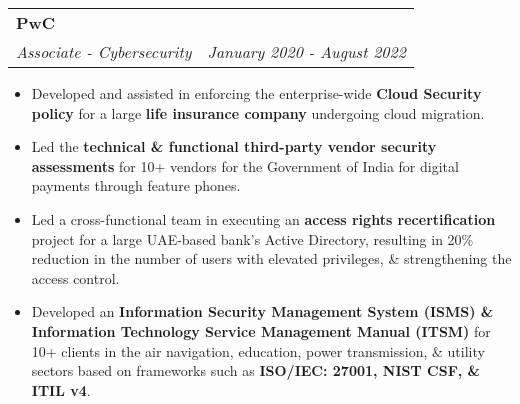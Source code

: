 \documentclass[letterpaper,11pt]{article}
\makeatletter
\newcommand{\resumeItem}[1]{
  \item\small{
    {#1 \vspace{-2pt}}
  }
}
\newcommand{\resumeSubheading}[4]{
  \vspace{-2pt}\item
    \begin{tabular*}{0.97\textwidth}[t]{l@{\extracolsep{\fill}}r}
      \textbf{#1} & #2 \\
      \textit{\small#3} & \textit{\small #4} \\
    \end{tabular*}\vspace{0pt}
}
\newcommand{\resumeItemListStart}{\begin{itemize}}
\newcommand{\resumeItemListEnd}{\end{itemize}\vspace{-5pt}}
\makeatother
\begin{document}
\resumeSubheading
      {PwC}{}
      {Associate - Cybersecurity}{January 2020 - August 2022}
      \resumeItemListStart
       \resumeItem{}
       {Developed and assisted in enforcing the enterprise-wide\textbf{ Cloud Security policy} for a large \textbf{life insurance company} undergoing cloud migration.} 
       \resumeItem{}
       {Led the \textbf{technical \& functional third-party vendor security assessments} for 10+ vendors for the Government of India for digital payments through feature phones. }
        \resumeItem{}
        {Led a cross-functional team in executing an \textbf{access rights recertification} project for a large UAE-based bank's Active Directory, resulting in 20\% reduction in the number of users with elevated privileges, \& strengthening the access control.}
        \resumeItem{}
        {Developed an \textbf{Information Security Management System (ISMS) \& Information Technology Service Management Manual (ITSM)} for 10+ clients in the air navigation, education, power transmission, \& utility sectors based on frameworks such as\textbf{ ISO/IEC: 27001, NIST CSF, \& ITIL v4}.}
        
      \resumeItemListEnd

    
\end{document}
